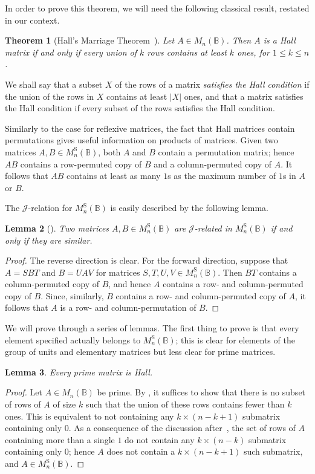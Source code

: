 \documentclass[11pt]{article}
\newtheorem{thm}{Theorem}[subsection]
\newtheorem{lemma}[thm]{Lemma}
\numberwithin{equation}{section}
\newcommand{\B}{\mathbb{B}}
\newcommand{\Bn}{M_n(\B)}
\newcommand{\Halln}{M_n^{\text{S}}(\B)}
\newcommand{\J}{\mathscr{J}}
\begin{document}
In order to prove this theorem, we will need the following classical result,
restated in our context.

\begin{thm}[Hall's Marriage Theorem~{\cite[Theorem 1]{Hall1935aa}}]
  Let $A \in \Bn$. Then $A$ is a Hall matrix if and only if every union of $k$
  rows contains at least $k$ ones, for $1 \leq k \leq n$.
\end{thm}
We shall say that a subset $X$ of the rows of a matrix \emph{satisfies the Hall
  condition} if the union of the rows in $X$ contains at least $|X|$ ones, and
that a matrix satisfies the Hall condition if every subset of the rows satisfies
the Hall condition.

Similarly to the case for reflexive matrices, the fact that Hall matrices contain
permutations gives useful information on products of matrices. Given two
matrices $A, B \in \Halln$, both $A$ and $B$ contain a permutation matrix; hence
$AB$ contains a row-permuted copy of $B$ and a column-permuted copy of $A$. It
follows that $AB$ contains at least as many $1$s as the maximum number of $1$s
in $A$ or $B$.

The $\J$-relation for $\Halln$ is easily described by the following lemma.
\begin{lemma}[{\cite[Theorem 2]{Butler1974aa}}]
  Two matrices $A, B \in \Halln$ are $\J$-related in $\Halln$ if and only if
  they are similar.
\end{lemma}
\begin{proof}
  The reverse direction is clear. For the forward direction, suppose that $A =
  SBT$ and $B = UAV$ for matrices $S, T, U, V \in \Halln$. Then $BT$ contains a
  column-permuted copy of $B$, and hence $A$ contains a row- and column-permuted
  copy of $B$. Since, similarly, $B$ contains a row- and column-permuted copy of
  $A$, it follows that $A$ is a row- and column-permutation of $B$.
\end{proof}

We will prove  through a series of lemmas. The
first thing to prove is that every element specified actually belongs to
$\Halln$; this is clear for elements of the group of units and elementary
matrices but less clear for prime matrices.

\begin{lemma}
Every prime matrix is Hall.
\end{lemma}
\begin{proof}
  Let $A \in \Bn$ be prime. By , it suffices to show
  that there is no subset of rows of $A$ of size $k$ such that the union of
  these rows contains fewer than $k$ ones. This is equivalent to not containing
  any $k \times (n - k + 1)$ submatrix containing only $0$. As a consequence of
  the discussion after~\cite[Definition 2.4]{Caen1981aa}, the set of rows of $A$
  containing more than a single $1$ do not contain any $k \times (n - k)$
  submatrix containing only $0$; hence $A$ does not contain a $k \times (n - k +
  1)$ such submatrix, and $A \in \Halln$.
\end{proof}
\end{document}
